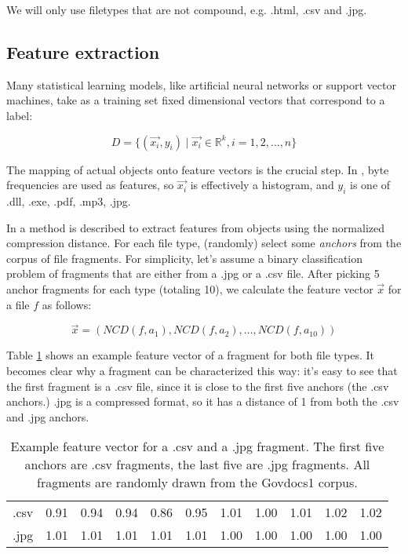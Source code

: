 We will only use filetypes that are not compound, e.g. .html, .csv and
.jpg.

\subsection{Feature extraction}

Many statistical learning models, like artificial neural networks or
support vector machines, take as a training set fixed dimensional
vectors that correspond to a label:

\begin{equation}
  D = \{ (\vec{x_{i}}, y_{i}) \mid \vec{x_{i}} \in \mathbb{R}^{k}, i = 1, 2, \dots, n \}
\end{equation}

The mapping of actual objects onto feature vectors is the crucial step. In
\cite{Li2010}, byte frequencies are used as features, so $\vec{x_{i}}$ is
effectively a histogram, and $y_{i}$ is one of .dll, .exe, .pdf, .mp3,
.jpg. 

In \cite{Cilibrasi2007} a method is described to extract features from
objects using the normalized compression distance. For each file type,
(randomly) select some \emph{anchors} from the corpus of file fragments.
For simplicity, let's assume a binary classification problem of fragments
that are either from a .jpg or a .csv file. After picking 5 anchor
fragments for each type (totaling 10), we calculate the feature vector $\vec{x}$ for a file $f$ as follows:

\begin{equation}\label{}
  \vec{x} = ( NCD(f, a_{1}), NCD(f, a_{2}), \dots, NCD(f, a_{10}) )
\end{equation}

Table \ref{table:feature_vectors} shows an example feature vector of
a fragment for both file types. It becomes clear why a fragment can be
characterized this way: it's easy to see that the first fragment is a .csv
file, since it is close to the first five anchors (the .csv anchors.) .jpg
is a compressed format, so it has a distance of 1 from both the .csv and
.jpg anchors.

\begin{table}
\begin{tabular}{lrrrrrrrrrr}
\hline
 .csv & 0.91 & 0.94 & 0.94 & 0.86 & 0.95 & 1.01 & 1.00 & 1.01 & 1.02 & 1.02 \\
 .jpg & 1.01 & 1.01 & 1.01 & 1.01 & 1.01 & 1.00 & 1.00 & 1.00 & 1.00 & 1.00 \\
\hline
\end{tabular} \caption{Example feature vector for a .csv and a .jpg
fragment. The first five anchors are .csv fragments, the last five are
.jpg fragments. All fragments are randomly drawn from the Govdocs1
corpus.} \label{table:feature_vectors} \end{table}

